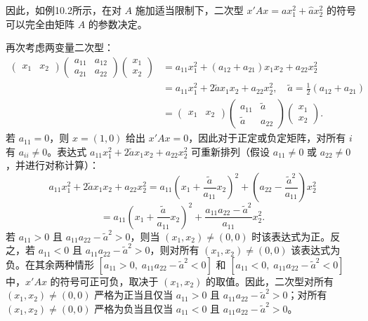 \begin{translation}
因此，如例10.2所示，在对 $A$ 施加适当限制下，二次型 $x'Ax = a x_1^2 + \hat{a} x_2^2$ 的符号可以完全由矩阵 $A$ 的参数决定。

再次考虑两变量二次型：
\begin{align*}
\begin{pmatrix} x_1 & x_2 \end{pmatrix}
\begin{pmatrix} a_{11} & a_{12} \\ a_{21} & a_{22} \end{pmatrix}
\begin{pmatrix} x_1 \\ x_2 \end{pmatrix}
&= a_{11}x_1^2 + (a_{12}+a_{21})x_1x_2 + a_{22}x_2^2 \\
&= a_{11}x_1^2 + 2\tilde{a} x_1x_2 + a_{22}x_2^2, \quad \tilde{a} = \tfrac{1}{2}(a_{12}+a_{21}) \\
&= \begin{pmatrix} x_1 & x_2 \end{pmatrix}
\begin{pmatrix} a_{11} & \tilde{a} \\ \tilde{a} & a_{22} \end{pmatrix}
\begin{pmatrix} x_1 \\ x_2 \end{pmatrix}. \tag{10.1}
\end{align*}
若 $a_{11} = 0$，则 $x = (1,0)$ 给出 $x'Ax = 0$，因此对于正定或负定矩阵，对所有 $i$ 有 $a_{ii} \neq 0$。表达式 $a_{11}x_1^2 + 2\tilde{a}x_1x_2 + a_{22}x_2^2$ 可重新排列（假设 $a_{11} \neq 0$ 或 $a_{22} \neq 0$，并进行对称计算）：
\[
a_{11}x_1^2 + 2\tilde{a}x_1x_2 + a_{22}x_2^2 = a_{11}\left(x_1 + \frac{\tilde{a}}{a_{11}}x_2\right)^2 + \left(a_{22} - \frac{\tilde{a}^2}{a_{11}}\right)x_2^2
\]
\[
= a_{11}\left(x_1 + \frac{\tilde{a}}{a_{11}}x_2\right)^2 + \frac{a_{11}a_{22} - \tilde{a}^2}{a_{11}}x_2^2.
\]
若 $a_{11} > 0$ 且 $a_{11}a_{22} - \tilde{a}^2 > 0$，则当 $(x_1, x_2) \neq (0,0)$ 时该表达式为正。反之，若 $a_{11} < 0$ 且 $a_{11}a_{22} - \tilde{a}^2 > 0$，则对所有 $(x_1, x_2) \neq (0,0)$ 该表达式为负。在其余两种情形 $[a_{11} > 0,\; a_{11}a_{22} - \tilde{a}^2 < 0]$ 和 $[a_{11} < 0,\; a_{11}a_{22} - \tilde{a}^2 < 0]$ 中，$x'Ax$ 的符号可正可负，取决于 $(x_1, x_2)$ 的取值。因此，二次型对所有 $(x_1, x_2) \neq (0,0)$ 严格为正当且仅当 $a_{11} > 0$ 且 $a_{11}a_{22} - \tilde{a}^2 > 0$；对所有 $(x_1, x_2) \neq (0,0)$ 严格为负当且仅当 $a_{11} < 0$ 且 $a_{11}a_{22} - \tilde{a}^2 > 0$。
\end{translation}

